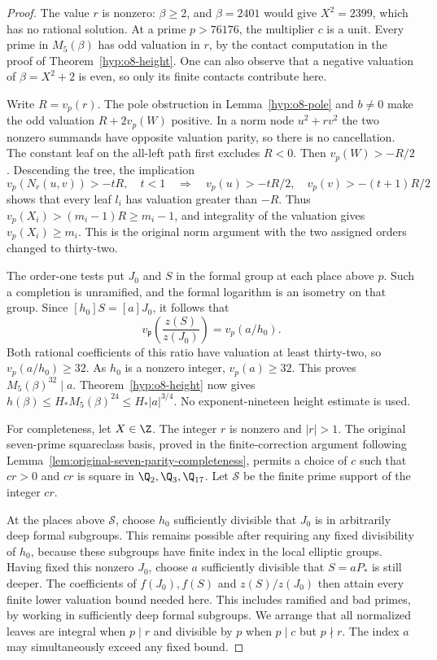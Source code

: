 \begin{proof}
The value $r$ is nonzero: $\beta\ge2$, and $\beta=2401$ would
give $X^2=2399$, which has no rational solution. At a prime
$p>76176$, the multiplier $c$ is a unit. Every prime in $M_5(\beta)$
has odd valuation in $r$, by the contact computation in the proof of
Theorem~\ref{hyp:o8-height}. One can also observe that a negative
valuation of $\beta=X^2+2$ is even, so only its finite contacts
contribute here.

Write $R=v_p(r)$. The pole obstruction in Lemma~\ref{hyp:o8-pole}
and $b\ne0$ make the odd valuation $R+2v_p(W)$ positive. In a
norm node $u^2+rv^2$ the two nonzero summands have opposite valuation
parity, so there is no cancellation. The constant leaf on the
all-left path first excludes $R<0$. Then $v_p(W)>-R/2$.
Descending the tree, the implication
\[
 v_p(N_r(u,v))>-tR,\quad t<1
 \quad\Longrightarrow\quad
 v_p(u)>-tR/2,\quad v_p(v)>-(t+1)R/2
\]
shows that every leaf $l_i$ has valuation greater than $-R$.
Thus $v_p(X_i)>(m_i-1)R\ge m_i-1$, and integrality of the
valuation gives $v_p(X_i)\ge m_i$. This is the original norm
argument with the two assigned orders changed to thirty-two.

The order-one tests put $J_0$ and $S$ in the formal group at each
place above $p$. Such a completion is unramified, and the formal
logarithm is an isometry on that group. Since
$[h_0]S=[a]J_0$, it follows that
\[
 v_{\mathfrak p}\!\left(\frac{z(S)}{z(J_0)}\right)
       =v_p(a/h_0).
\]
Both rational coefficients of this ratio have valuation at least
thirty-two, so $v_p(a/h_0)\ge32$. As $h_0$ is a nonzero integer,
$v_p(a)\ge32$. This proves $M_5(\beta)^{32}\mid a$.
Theorem~\ref{hyp:o8-height} now gives
$h(\beta)\le H_*M_5(\beta)^{24}\le H_*|a|^{3/4}$.
No exponent-nineteen height estimate is used.

For completeness, let $X\in\Z$. The integer $r$ is nonzero and
$|r|>1$. The original seven-prime squareclass basis, proved in the
finite-correction argument following
Lemma~\ref{lem:original-seven-parity-completeness}, permits a choice
of $c$ such that $cr>0$ and $cr$ is square in
$\Q_2,\Q_3,\Q_{17}$. Let $\mathcal S$ be the finite prime support
of the integer $cr$.

At the places above $\mathcal S$, choose $h_0$ sufficiently
divisible that $J_0$ is in arbitrarily deep formal subgroups.
This remains possible after requiring any fixed divisibility of
$h_0$, because these subgroups have finite index in the local
elliptic groups. Having fixed this nonzero $J_0$, choose $a$
sufficiently divisible that $S=aP_*$ is still deeper. The
coefficients of $f(J_0),f(S)$ and $z(S)/z(J_0)$ then attain every
finite lower valuation bound needed here. This includes ramified
and bad primes, by working in sufficiently deep formal subgroups.
We arrange that all normalized leaves are integral when $p\mid r$
and divisible by $p$ when $p\mid c$ but $p\nmid r$.
The index $a$ may simultaneously exceed any fixed bound.


\end{proof}
